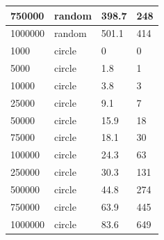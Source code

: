 \documentclass[12pt]{article}
\begin{document}
\begin{table}[h!]
\begin{tabular}{|l|l|l|l|}
750000  & random & 398.7                     & 248               \\ \hline
1000000 & random & 501.1                     & 414               \\ \hline
1000    & circle & 0                         & 0                 \\ \hline
5000    & circle & 1.8                       & 1                 \\ \hline
10000   & circle & 3.8                       & 3                 \\ \hline
25000   & circle & 9.1                       & 7                 \\ \hline
50000   & circle & 15.9                      & 18                \\ \hline
75000   & circle & 18.1                      & 30                \\ \hline
100000  & circle & 24.3                      & 63                \\ \hline
250000  & circle & 30.3                      & 131               \\ \hline
500000  & circle & 44.8                      & 274               \\ \hline
750000  & circle & 63.9                      & 445               \\ \hline
1000000 & circle & 83.6                      & 649               \\ \hline
\end{tabular}
\end{table}
\end{document}

